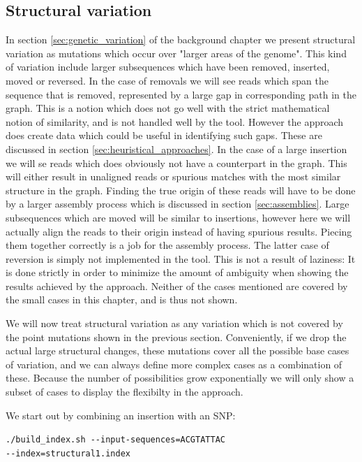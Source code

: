 \documentclass[thesis.tex]{subfiles}
\begin{document}
\subsection*{Structural variation}
In section \ref{sec:genetic_variation} of the background chapter we present structural variation as mutations which occur over "larger areas of the genome". This kind of variation include larger subsequences which have been removed, inserted, moved or reversed. In the case of removals we will see reads which span the sequence that is removed, represented by a large gap in corresponding path in the graph. This is a notion which does not go well with the strict mathematical notion of similarity, and is not handled well by the tool. However the approach does create data which could be useful in identifying such gaps. These are discussed in section \ref{sec:heuristical_approaches}. In the case of a large insertion we will se reads which does obviously not have a counterpart in the graph. This will either result in unaligned reads or spurious matches with the most similar structure in the graph. Finding the true origin of these reads will have to be done by a larger assembly process which is discussed in section \ref{sec:assemblies}. Large subsequences which are moved will be similar to insertions, however here we will actually align the reads to their origin instead of having spurious results. Piecing them together correctly is a job for the assembly process. The latter case of reversion is simply not implemented in the tool. This is not a result of laziness: It is done strictly in order to minimize the amount of ambiguity when showing the results achieved by the approach. Neither of the cases mentioned are covered by the small cases in this chapter, and is thus not shown.\\
\par\noindent
We will now treat structural variation as any variation which is not covered by the point mutations shown in the previous section. Conveniently, if we drop the actual large structural changes, these mutations cover all the possible base cases of variation, and we can always define more complex cases as a combination of these. Because the number of possibilities grow exponentially we will only show a subset of cases to display the flexibilty in the approach.\\
\par\noindent
We start out by combining an insertion with an SNP:\\
\par\noindent
\texttt{./build\_index.sh -{}-input-sequences=ACGTATTAC \\
-{}-index=structural1.index}\\
\end{document}
